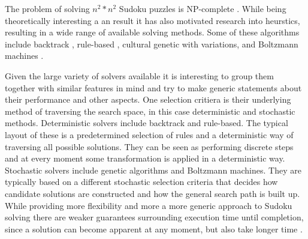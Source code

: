 \documentclass[a4paper,11pt]{kth-mag}
\begin{document}
The problem of solving $n^2 * n^2$ Sudoku puzzles is NP-complete \cite{complexity}.
While being theoretically interesting a an result it has also motivated research into heurstics, resulting in a wide range of available solving methods.
Some of these algorithms include backtrack \cite{searchBased}, rule-based \cite{techniques}, cultural genetic with variations\cite{stochastic}, and Boltzmann machines \cite{boltzmann}.

Given the large variety of solvers available it is interesting to group them together with similar features in mind and try to make generic statements about their performance and other aspects.
One selection critiera is their underlying method of traversing the search space, in this case deterministic and stochastic methods.
Deterministic solvers include backtrack and rule-based.
The typical layout of these is a predetermined selection of rules and a deterministic way of traversing all possible solutions.
They can be seen as performing discrete steps and at every moment some transformation is applied in a deterministic way.
Stochastic solvers include genetic algorithms and Boltzmann machines.
They are typically based on a different stochastic selection criteria that decides how candidate solutions are constructed and how the general search path is built up.
While providing more flexibility and more a more generic approach to Sudoku solving there are weaker guarantees surrounding execution time until completion, since a solution can become apparent at any moment, but also take longer time \cite{stochastic}.
\end{document}
